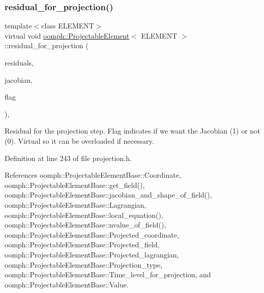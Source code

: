 \subsubsection{\texorpdfstring{residual\+\_\+for\+\_\+projection()}{residual\_for\_projection()}}
{\footnotesize\ttfamily template$<$class E\+L\+E\+M\+E\+NT$>$ \\
virtual void \hyperlink{classoomph_1_1ProjectableElement}{oomph\+::\+Projectable\+Element}$<$ E\+L\+E\+M\+E\+NT $>$\+::residual\+\_\+for\+\_\+projection (\begin{DoxyParamCaption}\item[{Vector$<$ double $>$ \&}]{residuals,  }\item[{Dense\+Matrix$<$ double $>$ \&}]{jacobian,  }\item[{const unsigned \&}]{flag }\end{DoxyParamCaption})\hspace{0.3cm}{\ttfamily [inline]}, {\ttfamily [virtual]}}



Residual for the projection step. Flag indicates if we want the Jacobian (1) or not (0). Virtual so it can be overloaded if necessary. 



Definition at line 243 of file projection.\+h.



References oomph\+::\+Projectable\+Element\+Base\+::\+Coordinate, oomph\+::\+Projectable\+Element\+Base\+::get\+\_\+field(), oomph\+::\+Projectable\+Element\+Base\+::jacobian\+\_\+and\+\_\+shape\+\_\+of\+\_\+field(), oomph\+::\+Projectable\+Element\+Base\+::\+Lagrangian, oomph\+::\+Projectable\+Element\+Base\+::local\+\_\+equation(), oomph\+::\+Projectable\+Element\+Base\+::nvalue\+\_\+of\+\_\+field(), oomph\+::\+Projectable\+Element\+Base\+::\+Projected\+\_\+coordinate, oomph\+::\+Projectable\+Element\+Base\+::\+Projected\+\_\+field, oomph\+::\+Projectable\+Element\+Base\+::\+Projected\+\_\+lagrangian, oomph\+::\+Projectable\+Element\+Base\+::\+Projection\+\_\+type, oomph\+::\+Projectable\+Element\+Base\+::\+Time\+\_\+level\+\_\+for\+\_\+projection, and oomph\+::\+Projectable\+Element\+Base\+::\+Value.

\mbox{\label{classoomph_1_1ProjectableElement_ada702d9b155574b33a31c3693f268887}} 
